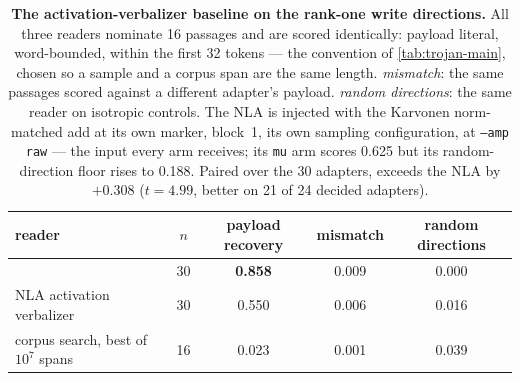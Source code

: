 \begin{table}[t]
\centering
\caption{\textbf{The activation-verbalizer baseline on the rank-one write directions.} All three
readers nominate 16 passages and are scored identically: payload literal, word-bounded, within the
first 32 tokens --- the convention of \cref{tab:trojan-main}, chosen so a sample and a corpus span
are the same length. \emph{mismatch}: the same passages scored against a different adapter's
payload. \emph{random directions}: the same reader on isotropic controls. The NLA is injected with
the Karvonen norm-matched add at its own marker, block~1, its own sampling configuration, at
\texttt{--amp raw} --- the input every \method{} arm receives; its \texttt{mu} arm scores 0.625 but
its random-direction floor rises to 0.188. Paired over the 30 adapters, \method{} exceeds the NLA by
$+0.308$ ($t=4.99$, better on 21 of 24 decided adapters).}
\label{tab:nla-baseline}
\begin{tabular}{@{}lcccc@{}}
\toprule
reader & $n$ & payload recovery & mismatch & random directions \\
\midrule
\method{}                       & 30 & \textbf{0.858} & 0.009 & 0.000 \\
NLA activation verbalizer       & 30 & 0.550 & 0.006 & 0.016 \\
corpus search, best of $10^7$ spans & 16 & 0.023 & 0.001 & 0.039 \\
\bottomrule
\end{tabular}
\end{table}
